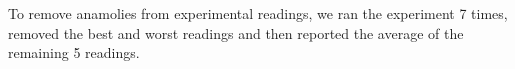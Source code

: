 To remove anamolies from experimental readings, we ran the experiment 7
times, removed the best and worst readings and then reported the
average of the remaining 5 readings.



%
%
